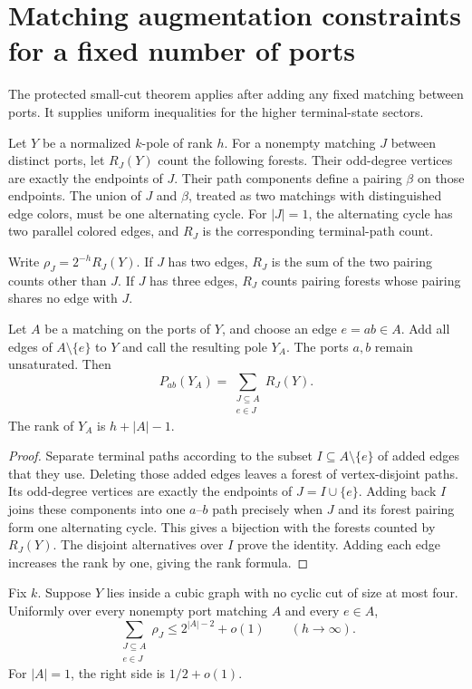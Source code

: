 \section{Matching augmentation constraints for a fixed number of ports}
\label{sec:matching-augmentation}

The protected small-cut theorem applies after adding any fixed matching between ports.
It supplies uniform inequalities for the higher terminal-state sectors.

Let $Y$ be a normalized $k$-pole of rank $h$.
For a nonempty matching $J$ between distinct ports, let $R_J(Y)$ count the following forests.
Their odd-degree vertices are exactly the endpoints of $J$.
Their path components define a pairing $\beta$ on those endpoints.
The union of $J$ and $\beta$, treated as two matchings with distinguished edge colors, must be one alternating cycle.
For $|J|=1$, the alternating cycle has two parallel colored edges, and $R_J$ is the corresponding terminal-path count.

Write $\rho_J=2^{-h}R_J(Y)$.
If $J$ has two edges, $R_J$ is the sum of the two pairing counts other than $J$.
If $J$ has three edges, $R_J$ counts pairing forests whose pairing shares no edge with $J$.

\begin{proposition}
\label{prop:matching-augmentation-identity}
Let $A$ be a matching on the ports of $Y$, and choose an edge $e=ab\in A$.
Add all edges of $A\setminus\{e\}$ to $Y$ and call the resulting pole $Y_A$.
The ports $a,b$ remain unsaturated.
Then
\[
 P_{ab}(Y_A)=\sum_{\substack{J\subseteq A\\e\in J}}R_J(Y).
\]
The rank of $Y_A$ is $h+|A|-1$.
\end{proposition}

\begin{proof}
Separate terminal paths according to the subset $I\subseteq A\setminus\{e\}$ of added edges that they use.
Deleting those added edges leaves a forest of vertex-disjoint paths.
Its odd-degree vertices are exactly the endpoints of $J=I\cup\{e\}$.
Adding back $I$ joins these components into one $a$--$b$ path precisely when $J$ and its forest pairing form one alternating cycle.
This gives a bijection with the forests counted by $R_J(Y)$.
The disjoint alternatives over $I$ prove the identity.
Adding each edge increases the rank by one, giving the rank formula.
\end{proof}

\begin{theorem}
\label{thm:matching-augmentation-inequalities}
Fix $k$.
Suppose $Y$ lies inside a cubic graph with no cyclic cut of size at most four.
Uniformly over every nonempty port matching $A$ and every $e\in A$,
\begin{equation}\label{eq:matching-augmentation-bound}
 \sum_{\substack{J\subseteq A\\e\in J}}\rho_J
 \le2^{|A|-2}+o(1)
 \qquad(h\to\infty).
\end{equation}
For $|A|=1$, the right side is $1/2+o(1)$.
\end{theorem}

